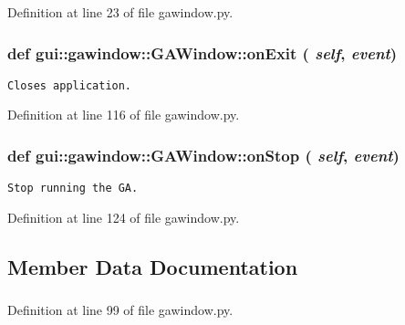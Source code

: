 Definition at line 23 of file gawindow.py.
\subsubsection{\setlength{\rightskip}{0pt plus 5cm}def gui::gawindow::GAWindow::onExit ( {\em self},  {\em event})}\label{classgui_1_1gawindow_1_1GAWindow_7a1d879d7a332f2336bd1b220f2621a7}




\footnotesize\begin{verbatim}
Closes application.
\end{verbatim}
\normalsize
 

Definition at line 116 of file gawindow.py.
\subsubsection{\setlength{\rightskip}{0pt plus 5cm}def gui::gawindow::GAWindow::onStop ( {\em self},  {\em event})}\label{classgui_1_1gawindow_1_1GAWindow_158eeca0b12acd2b03c8d85d4dc65223}




\footnotesize\begin{verbatim}
Stop running the GA.
\end{verbatim}
\normalsize
 

Definition at line 124 of file gawindow.py.

\subsection{Member Data Documentation}
\subsubsection{}\label{classgui_1_1gawindow_1_1GAWindow_57a09baf7c9045588c0a77f8d85b9a43}




Definition at line 99 of file gawindow.py.
